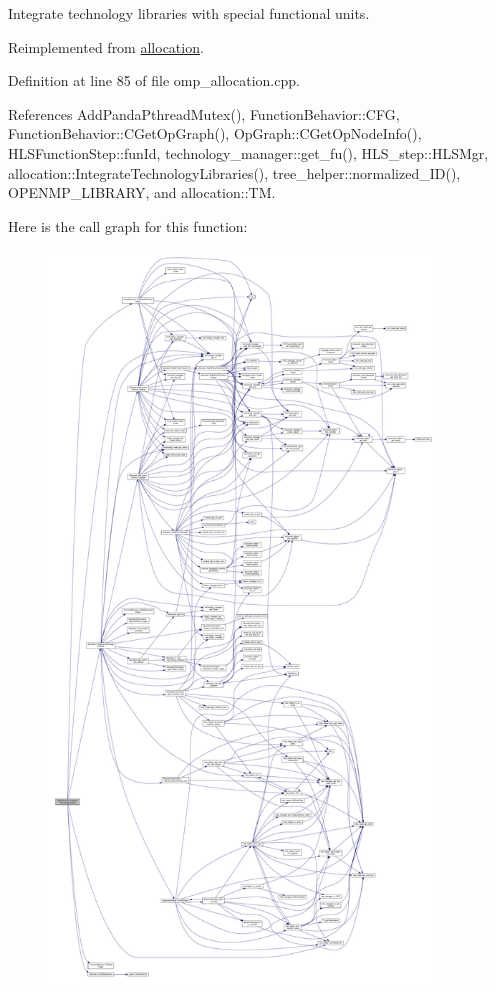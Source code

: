 Integrate technology libraries with special functional units. 



Reimplemented from \hyperlink{classallocation_a2a1bfe82ec889179c591b1ebee43464b}{allocation}.



Definition at line 85 of file omp\+\_\+allocation.\+cpp.



References Add\+Panda\+Pthread\+Mutex(), Function\+Behavior\+::\+C\+FG, Function\+Behavior\+::\+C\+Get\+Op\+Graph(), Op\+Graph\+::\+C\+Get\+Op\+Node\+Info(), H\+L\+S\+Function\+Step\+::fun\+Id, technology\+\_\+manager\+::get\+\_\+fu(), H\+L\+S\+\_\+step\+::\+H\+L\+S\+Mgr, allocation\+::\+Integrate\+Technology\+Libraries(), tree\+\_\+helper\+::normalized\+\_\+\+I\+D(), O\+P\+E\+N\+M\+P\+\_\+\+L\+I\+B\+R\+A\+RY, and allocation\+::\+TM.

Here is the call graph for this function\+:
\nopagebreak
\begin{figure}[H]
\begin{center}
\leavevmode
\includegraphics[height=550pt]{d9/dd3/classOmpAllocation_a7be1bcabcbba606451d0abe4e70970f2_cgraph}
\end{center}
\end{figure}


